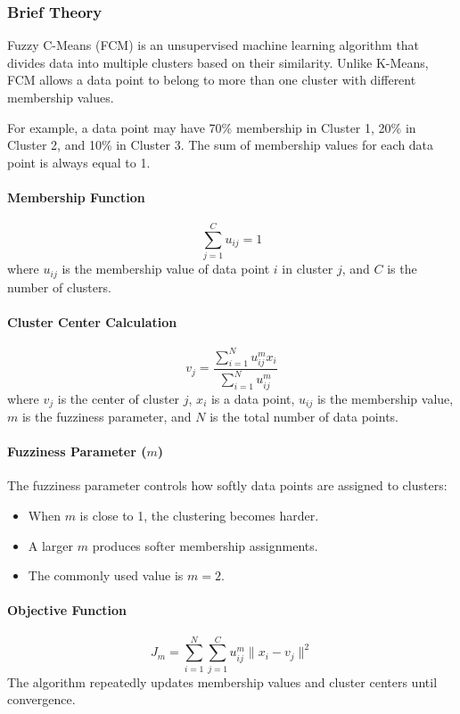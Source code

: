 \documentclass[a4paper,11pt]{article}
\begin{document}
\subsubsection{Brief Theory}
Fuzzy C-Means (FCM) is an unsupervised machine learning algorithm that divides data into multiple clusters based on their similarity. Unlike K-Means, FCM allows a data point to belong to more than one cluster with different membership values.

For example, a data point may have 70\% membership in Cluster 1, 20\% in Cluster 2, and 10\% in Cluster 3. The sum of membership values for each data point is always equal to 1.

\paragraph{Membership Function}
\[
\sum_{j=1}^{C} u_{ij} = 1
\]
where $u_{ij}$ is the membership value of data point $i$ in cluster $j$, and $C$ is the number of clusters.

\paragraph{Cluster Center Calculation}
\[
v_j = \frac{\sum_{i=1}^{N} u_{ij}^{m} x_i}{\sum_{i=1}^{N} u_{ij}^{m}}
\]
where $v_j$ is the center of cluster $j$, $x_i$ is a data point, $u_{ij}$ is the membership value, $m$ is the fuzziness parameter, and $N$ is the total number of data points.

\paragraph{Fuzziness Parameter ($m$)}
The fuzziness parameter controls how softly data points are assigned to clusters:
\begin{itemize}
    \item When $m$ is close to 1, the clustering becomes harder.
    \item A larger $m$ produces softer membership assignments.
    \item The commonly used value is $m = 2$.
\end{itemize}

\paragraph{Objective Function}
\[
J_m = \sum_{i=1}^{N} \sum_{j=1}^{C} u_{ij}^{m} \| x_i - v_j \|^2
\]
The algorithm repeatedly updates membership values and cluster centers until convergence.
\end{document}
